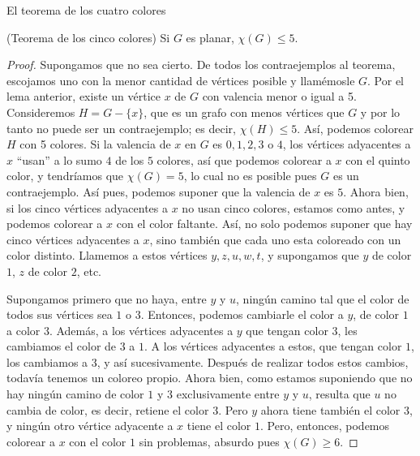 \begin{section}{El teorema de los cuatro colores}
\begin{teorema}\label{tA4.3.1}(Teorema de los cinco colores) Si $G$ es planar, $\chi (G)\le 5$.
\end{teorema}
\begin{proof}
 Supongamos que no sea cierto. De todos los contraejemplos al teorema, escojamos uno con la menor cantidad de
vértices posible y llamémosle $G$. Por el lema anterior, existe un vértice $x$ de $G$ con valencia menor o igual a 5. Consideremos $H=G-\{x\}$, que es un grafo con menos vértices que $G$ y por lo tanto no puede ser un contraejemplo; es decir, $\chi (H)\le 5$. Así, podemos colorear $H$ con 5 colores. Si la valencia de $x$ en $G$ es $0,1,2,3$ o $4$, los vértices adyacentes a $x$ ``usan'' a lo sumo $4$ de los $5$ colores, así que podemos colorear a $x$ con el quinto color, y tendríamos que $\chi (G)=5$, lo cual no es posible pues $G$ es un contraejemplo. Así pues, podemos suponer que la valencia de $x$ es $5$. Ahora bien, si los cinco vértices adyacentes a $x$ no usan cinco colores, estamos como antes, y podemos colorear a $x$ con el color faltante. Así, no solo podemos suponer que hay cinco vértices adyacentes a $x$, sino también que cada uno esta coloreado con un color distinto. Llamemos a estos vértices $y,z,u,w,t$, y supongamos que $y$ de color $1$, $z$ de color $2$, etc.

\begin{figure}[h]
    \begin{center}
\end{center}
\caption{}\label{fA4.11}
\end{figure}

Supongamos primero que no haya, entre $y$ y $u$, ningún camino tal que el color de todos sus vértices sea $1$ o $3$. Entonces, podemos cambiarle el color a $y$, de color $1$ a color $3$. Además, a los vértices adyacentes a $y$ que tengan color $3$, les cambiamos el color de $3$ a $1$. A los vértices adyacentes a estos, que tengan color $1$, los cambiamos a $3$, y así sucesivamente. Después de realizar todos estos cambios, todavía tenemos un coloreo propio. Ahora bien, como estamos suponiendo que no hay ningún camino de
color $1$ y $3$ exclusivamente entre $y$ y $u$, resulta que $u$ no cambia de color, es decir, retiene el color $3$. Pero $y$ ahora tiene también el color $3$, y ningún otro vértice adyacente a $x$ tiene el color $1$. Pero, entonces, podemos colorear a $x$ con el color $1$ sin problemas, absurdo pues $\chi(G)\ge 6$.


\end{proof}
\end{section}
